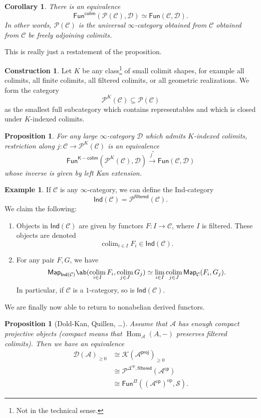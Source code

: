 \documentclass[10pt, oneside]{memoir}
\newtheorem{cor}[thm]{Corollary}
\newtheorem{prop}[thm]{Proposition}
\theoremstyle{definition}
\newtheorem{con}[thm]{Construction}
\newtheorem{exm}[thm]{Example}
\theoremstyle{remark}
\theoremstyle{plain}
\theoremstyle{definition}
\theoremstyle{remark}
\newcommand{\mc}[1]{\mathcal{#1}}
\newcommand{\ms}[1]{\mathsf{#1}}
\newcommand{\1}{\mathbf{1}}
\newcommand{\2}{\mathbf{2}}
\newcommand{\3}{\mathbf{3}}
\DeclareMathOperator{\Hom}{Hom}
\DeclareMathOperator{\op}{op}
\DeclareMathOperator*{\colim}{colim}
\begin{document}
\begin{cor}
    There is an equivalence
    \[ \ms{Fun}^{\ms{colim}}(\mc{P}(\mc{C}), \mc{D}) \simeq \ms{Fun}(\mc{C}, \mc{D}). \]
    In other words, $\mc{P}(\mc{C})$ is the universal $\infty$-category obtained from $\mc{C}$ obtained from $\mc{C}$ be freely adjoining colimits.
\end{cor}
This is really just a restatement of the proposition.

\begin{con}
    Let $K$ be any class\footnote{Not in the technical sense.} of small colimit shapes, for example all colimits, all finite colimits, all filtered colimits, or all geometric realizations. We form the category
    \[ \mc{P}^K(\mc{C}) \subseteq \mc{P}(\mc{C}) \]
    as the smallest full subcategory which contains representables and which is closed under $K$-indexed colimits.
\end{con}

\begin{prop}
    For any large $\infty$-category $\mc{D}$ which admits $K$-indexed colimits, restriction along $j \colon \mc{C} \to \mc{P}^K(\mc{C})$ is an equivalence
    \[ \ms{Fun}^{\ms{K-colim}} (\mc{P}^K(\mc{C}), \mc{D}) \xrightarrow{j^*} \ms{Fun}(\mc{C}, \mc{D}) \]
    whose inverse is given by left Kan extension.
\end{prop}

\begin{exm}
    If $\mc{C}$ is any $\infty$-category, we can define the Ind-category
    \[ \ms{Ind}(\mc{C}) = \mc{P}^{\ms{filtered}}(\mc{C}). \]
    We claim the following:
    \begin{enumerate}
        \item Objects in $\ms{Ind}(\mc{C})$ are given by functors $F \colon I \to \mc{C}$, where $I$ is filtered. These objects are denoted
        \[ \colim_{i \in I} F_i \in \ms{Ind}(\mc{C}). \]
        \item For any pair $F, G$, we have
        \[ \ms{Map}_{\ms{Ind}(\mc{C})} \ab(\colim_{i \in I} F_i, \colim_{j \in J} G_j) \simeq \lim_{i \in I} \colim_{j \in J} \ms{Map}_{\mc{C}}(F_i, G_j). \]
        In particular, if $\mc{C}$ is a $1$-category, so is $\ms{Ind}(\mc{C})$.
    \end{enumerate}
\end{exm}

We are finally now able to return to nonabelian derived functors.
\begin{prop}[Dold-Kan, Quillen, \dots]
    Assume that $\mc{A}$ has enough compact projective objects (compact means that $\Hom_{\mc{A}}(A,-)$ preserves filtered colimits). Then we have an equivalence
    \begin{align*}
        \mc{D}(\mc{A})_{\geq 0} &\cong \mc{K}(\mc{A}^{\ms{proj}})_{\geq 0} \\
        &\cong \mc{P}^{\Delta^{\op}, \ms{filtered}}(\mc{A}^{\ms{cp}}) \\
        &\cong \ms{Fun}^{\Pi} ((\mc{A}^{\ms{cp}})^{\op}, \mc{S}).
    \end{align*}
\end{prop}
\end{document}
